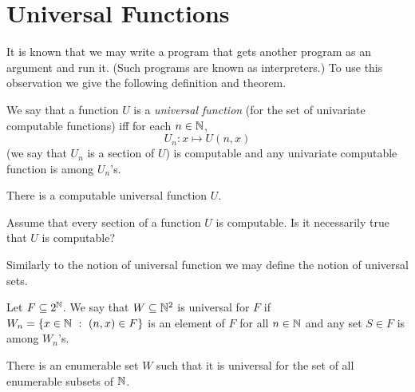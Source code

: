\chapter{Universal Functions}
It is known that we may write a program that gets another program as an argument
and run it. (Such programs are known as interpreters.) To use this observation
we give the following definition and theorem.
\begin{definition}
  We say that a function $U$ is a \emph{universal function} (for the set of
  univariate computable functions) iff for each $n \in {\mathbb{N}}$,
  \[
    U_n : x \mapsto U(n, x)
  \]
  (we say that $U_n$ is a section of $U$)
  is computable and any univariate computable function is among $U_n$'s.
\end{definition}

\begin{theorem}
\label{theorem:universal-function-computable}
  There is a computable universal function $U$.
\end{theorem}

\begin{exercise}
  Assume that every section of a function $U$ is computable.
  Is it necessarily true that $U$ is computable?
\end{exercise}

Similarly to the notion of universal function we may define the notion
of universal sets.
\begin{definition}
  Let $F \subseteq 2^{\mathbb{N}}$. We say that $W \subseteq {\mathbb{N}}^2$ is universal for $F$
  if $W_n = \set[(n, x) \in F]{x \in \N}$ is an element of $F$ for all
  $n \in {\mathbb{N}}$ and any set $S \in F$ is among $W_n$'s.
\end{definition}

\begin{theorem}
  There is an enumerable set $W$ such that it is universal for the set of
  all enumerable subsets of ${\mathbb{N}}$.
\end{theorem}

